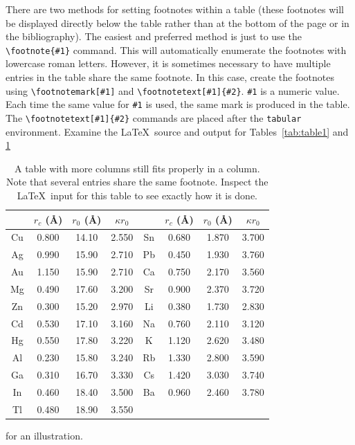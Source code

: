 \documentclass[%
 aapm,
 mph,%
 amsmath,amssymb,
 reprint,%
]{revtex4-2}
\begin{document}
There are two methods for setting footnotes within a table (these
footnotes will be displayed directly below the table rather than at
the bottom of the page or in the bibliography).
The easiest
and preferred method is just to use the \verb+\footnote{#1}+
command. This will automatically enumerate the footnotes with
lowercase roman letters.
However, it is sometimes necessary to have
multiple entries in the table share the same footnote.
In this case,
create the footnotes using
\verb+\footnotemark[#1]+ and \verb+\footnotetext[#1]{#2}+.
\texttt{\#1} is a numeric value.
Each time the same value for \texttt{\#1} is used, 
the same mark is produced in the table. 
The \verb+\footnotetext[#1]{#2}+ commands are placed after the \texttt{tabular}
environment. 
Examine the \LaTeX\ source and output for Tables~\ref{tab:table1} and 
\ref{tab:table2}%
\begin{table}
\caption{\label{tab:table2}A table with more columns still fits
properly in a column. Note that several entries share the same
footnote. Inspect the \LaTeX\ input for this table to see
exactly how it is done.}
\begin{ruledtabular}
\begin{tabular}{cccccccc}
 &$r_c$ (\AA)&$r_0$ (\AA)&$\kappa r_0$&
 &$r_c$ (\AA) &$r_0$ (\AA)&$\kappa r_0$\\
\hline
Cu& 0.800 & 14.10 & 2.550 &Sn\footnotemark[1]
& 0.680 & 1.870 & 3.700 \\
Ag& 0.990 & 15.90 & 2.710 &Pb\footnotemark[2]
& 0.450 & 1.930 & 3.760 \\
Au& 1.150 & 15.90 & 2.710 &Ca\footnotemark[3]
& 0.750 & 2.170 & 3.560 \\
Mg& 0.490 & 17.60 & 3.200 &Sr\footnotemark[4]
& 0.900 & 2.370 & 3.720 \\
Zn& 0.300 & 15.20 & 2.970 &Li\footnotemark[2]
& 0.380 & 1.730 & 2.830 \\
Cd& 0.530 & 17.10 & 3.160 &Na\footnotemark[5]
& 0.760 & 2.110 & 3.120 \\
Hg& 0.550 & 17.80 & 3.220 &K\footnotemark[5]
&  1.120 & 2.620 & 3.480 \\
Al& 0.230 & 15.80 & 3.240 &Rb\footnotemark[3]
& 1.330 & 2.800 & 3.590 \\
Ga& 0.310 & 16.70 & 3.330 &Cs\footnotemark[4]
& 1.420 & 3.030 & 3.740 \\
In& 0.460 & 18.40 & 3.500 &Ba\footnotemark[5]
& 0.960 & 2.460 & 3.780 \\
Tl& 0.480 & 18.90 & 3.550 & & & & \\
\end{tabular}
\end{ruledtabular}
\end{table}
for an illustration. 
\end{document}
